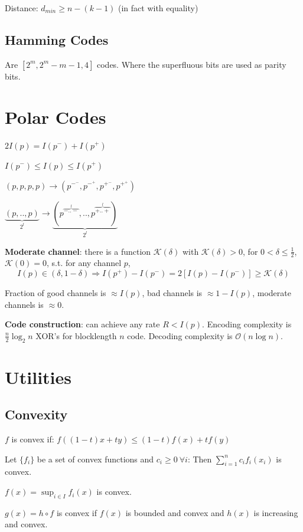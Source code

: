 \documentclass[10pt,a4paper,landscape]{article}
\begin{document}
\begin{multicols*}{4}
Distance: $d_{min} \geq n-(k-1)$ (in fact with equality)

\subsection{Hamming Codes}
Are $[2^m, 2^m - m - 1, 4]$ codes. Where the superfluous bits are used as parity bits.

\section{Polar Codes}
$2I(p) = I(p^-) + I(p^+)$

$I(p^-) \leq I(p) \leq I(p^+)$

$(p,p,p,p) \rightarrow (p^{-^-},p^{-^+},p^{+^-},p^{+^+})$

$\underbrace{(p,..,p)}_{2^l} \rightarrow \underbrace{(p^{\overbrace{-..-}^l},..,p^{\overbrace{+..+}^l})}_{2^l}$

\textbf{Moderate channel}: there is a function $\mathcal{K}(\delta)$ with $\mathcal{K}(\delta) > 0$, for $0 < \delta \leq \frac{1}{2}$, $\mathcal{K}(0) = 0$, s.t. for any channel $p$,
$$ I(p) \in (\delta,1-\delta) \Rightarrow I(p^+) - I(p^-) = 2[I(p) - I(p^-)] \geq \mathcal{K}(\delta)$$

Fraction of good channels is $\approx I(p)$, bad channels is $\approx 1-I(p)$, moderate channels is $\approx 0$.

\textbf{Code construction}: can achieve any rate $R < I(p)$. Encoding complexity is $\frac{n}{2} \log_2 n$ XOR's for blocklength $n$ code. Decoding complexity is $\mathcal{O}(n\log n)$.



\section{Utilities}
\subsection{Convexity}

$f$ is convex if: $f((1-t)x+ t y)\leq (1-t) f(x)+ t f(y)$

Let $\{f_i\}$ be a set of convex functions and $c_i \geq 0 \ \forall i$:
Then $\sum_{i=1}^n c_i f_i(x_i)$ is convex.

$f(x) = \sup_{i \in I} f_i(x)$ is convex.

$g(x) = h \circ f$ is convex if $f(x)$ is bounded and convex and $h(x)$ is increasing and convex.


\end{multicols*}
\end{document}
